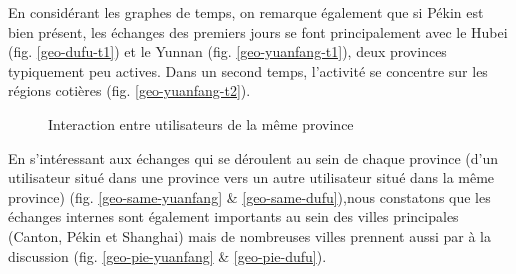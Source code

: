En consid\'erant les graphes de temps, on remarque \'egalement que si P\'ekin est bien pr\'esent, les \'echanges des premiers jours se font principalement avec le Hubei (fig. \ref{geo-dufu-t1}) et le Yunnan (fig. \ref{geo-yuanfang-t1}), deux provinces typiquement peu actives. Dans un second temps, l'activité se concentre sur les régions cotières (fig. \ref{geo-yuanfang-t2}).

\begin{figure}[H]
    \centering

     

    \caption{
        Interaction entre utilisateurs de la m\^eme province
    }

\end{figure}

En s{\textquoteright}int\'eressant aux \'echanges qui se d\'eroulent au sein de chaque province (d{\textquoteright}un utilisateur situ\'e dans une province vers un autre utilisateur situ\'e dans la m\^eme province) (fig. \ref{geo-same-yuanfang} \& \ref{geo-same-dufu}),nous constatons que les \'echanges internes sont \'egalement importants au sein des villes principales (Canton, P\'ekin et Shanghai) mais de
nombreuses villes prennent aussi par \`a la discussion (fig. \ref{geo-pie-yuanfang} \& \ref{geo-pie-dufu}). 



